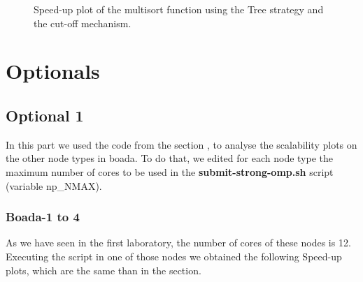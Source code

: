 \documentclass[12pt, a4paper]{article}
\begin{document}
\begin{figure}[H]
\begin{minipage}[b]{0.4\linewidth}
  \caption{Speed-up plot of the multisort function using the Tree strategy and the cut-off mechanism.}
  \label{fig:mandel-omp-10000-strong-21-speedup}
\end{minipage}
\end{figure}

\section{Optionals}

\subsection{Optional 1}

In this part we used the code from the section , to analyse the scalability plots on the other node types in boada. To do that, we edited for each node type the maximum number of cores to be used in the \textbf{submit-strong-omp.sh} script (variable np\_NMAX).

\subsubsection{Boada-1 to 4}

As we have seen in the first laboratory, the number of cores of these nodes is 12. Executing the script in one of those nodes we obtained the following Speed-up plots, which are the same than in the  section.
\end{document}

